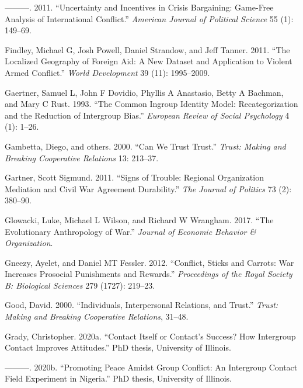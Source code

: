 \documentclass[11pt]{article}
\begin{document}
\leavevmode\hypertarget{ref-fey2011uncertainty}{}%
---------. 2011. ``Uncertainty and Incentives in Crisis Bargaining:
Game-Free Analysis of International Conflict.'' \emph{American Journal
of Political Science} 55 (1): 149--69.

\leavevmode\hypertarget{ref-findley2011localized}{}%
Findley, Michael G, Josh Powell, Daniel Strandow, and Jeff Tanner. 2011.
``The Localized Geography of Foreign Aid: A New Dataset and Application
to Violent Armed Conflict.'' \emph{World Development} 39 (11):
1995--2009.

\leavevmode\hypertarget{ref-gaertner1993common}{}%
Gaertner, Samuel L, John F Dovidio, Phyllis A Anastasio, Betty A
Bachman, and Mary C Rust. 1993. ``The Common Ingroup Identity Model:
Recategorization and the Reduction of Intergroup Bias.'' \emph{European
Review of Social Psychology} 4 (1): 1--26.

\leavevmode\hypertarget{ref-gambetta_ch13}{}%
Gambetta, Diego, and others. 2000. ``Can We Trust Trust.'' \emph{Trust:
Making and Breaking Cooperative Relations} 13: 213--37.

\leavevmode\hypertarget{ref-gartner2011signs}{}%
Gartner, Scott Sigmund. 2011. ``Signs of Trouble: Regional Organization
Mediation and Civil War Agreement Durability.'' \emph{The Journal of
Politics} 73 (2): 380--90.

\leavevmode\hypertarget{ref-glowacki2017evolutionary}{}%
Glowacki, Luke, Michael L Wilson, and Richard W Wrangham. 2017. ``The
Evolutionary Anthropology of War.'' \emph{Journal of Economic Behavior
\& Organization}.

\leavevmode\hypertarget{ref-gneezy2012conflict}{}%
Gneezy, Ayelet, and Daniel MT Fessler. 2012. ``Conflict, Sticks and
Carrots: War Increases Prosocial Punishments and Rewards.''
\emph{Proceedings of the Royal Society B: Biological Sciences} 279
(1727): 219--23.

\leavevmode\hypertarget{ref-good2000individuals}{}%
Good, David. 2000. ``Individuals, Interpersonal Relations, and Trust.''
\emph{Trust: Making and Breaking Cooperative Relations}, 31--48.

\leavevmode\hypertarget{ref-grady2020lab}{}%
Grady, Christopher. 2020a. ``Contact Itself or Contact's Success? How
Intergroup Contact Improves Attitudes.'' PhD thesis, University of
Illinois.

\leavevmode\hypertarget{ref-grady2020farmer}{}%
---------. 2020b. ``Promoting Peace Amidst Group Conflict: An Intergroup
Contact Field Experiment in Nigeria.'' PhD thesis, University of
Illinois.
\end{document}
